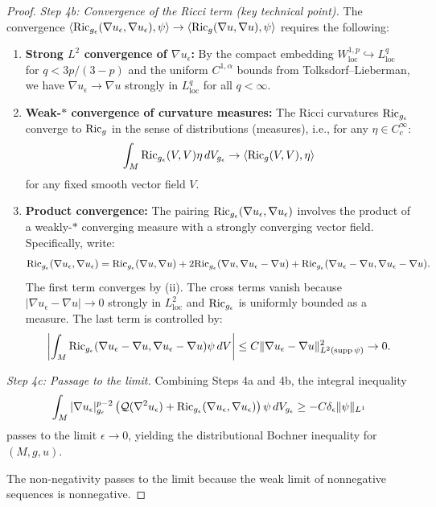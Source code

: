 \begin{proof}
\textit{Step 4b: Convergence of the Ricci term (key technical point).}
The convergence $\langle \mathrm{Ric}_{g_\epsilon}(\nabla u_\epsilon, \nabla u_\epsilon), \psi \rangle \to \langle \mathrm{Ric}_g(\nabla u, \nabla u), \psi \rangle$ requires the following:
\begin{enumerate}
    \item[(i)] \textbf{Strong $L^2$ convergence of $\nabla u_\epsilon$:} By the compact embedding $W^{1,p}_{\mathrm{loc}} \hookrightarrow L^q_{\mathrm{loc}}$ for $q < 3p/(3-p)$ and the uniform $C^{1,\alpha}$ bounds from Tolksdorf--Lieberman, we have $\nabla u_\epsilon \to \nabla u$ strongly in $L^q_{\mathrm{loc}}$ for all $q < \infty$.
    \item[(ii)] \textbf{Weak-$*$ convergence of curvature measures:} The Ricci curvatures $\mathrm{Ric}_{g_\epsilon}$ converge to $\mathrm{Ric}_g$ in the sense of distributions (measures), i.e., for any $\eta \in C^\infty_c$:
    \begin{equation}
        \int_M \mathrm{Ric}_{g_\epsilon}(V, V) \eta \, dV_{g_\epsilon} \to \langle \mathrm{Ric}_g(V, V), \eta \rangle
    \end{equation}
    for any fixed smooth vector field $V$.
    \item[(iii)] \textbf{Product convergence:} The pairing $\mathrm{Ric}_{g_\epsilon}(\nabla u_\epsilon, \nabla u_\epsilon)$ involves the product of a weakly-$*$ converging measure with a strongly converging vector field. Specifically, write:
    \begin{equation}
        \mathrm{Ric}_{g_\epsilon}(\nabla u_\epsilon, \nabla u_\epsilon) = \mathrm{Ric}_{g_\epsilon}(\nabla u, \nabla u) + 2\mathrm{Ric}_{g_\epsilon}(\nabla u, \nabla u_\epsilon - \nabla u) + \mathrm{Ric}_{g_\epsilon}(\nabla u_\epsilon - \nabla u, \nabla u_\epsilon - \nabla u).
    \end{equation}
    The first term converges by (ii). The cross terms vanish because $|\nabla u_\epsilon - \nabla u| \to 0$ strongly in $L^2_{\mathrm{loc}}$ and $\mathrm{Ric}_{g_\epsilon}$ is uniformly bounded as a measure. The last term is controlled by:
    \begin{equation}
        \left| \int_M \mathrm{Ric}_{g_\epsilon}(\nabla u_\epsilon - \nabla u, \nabla u_\epsilon - \nabla u) \psi \, dV \right| \le C \|\nabla u_\epsilon - \nabla u\|_{L^2(\mathrm{supp}\,\psi)}^2 \to 0.
    \end{equation}
\end{enumerate}

\textit{Step 4c: Passage to the limit.}
Combining Steps 4a and 4b, the integral inequality
\begin{equation}
    \int_M |\nabla u_\epsilon|^{p-2}_{g_\epsilon} \left(\mathcal{Q}(\nabla^2 u_\epsilon) + \mathrm{Ric}_{g_\epsilon}(\nabla u_\epsilon, \nabla u_\epsilon)\right) \psi \, dV_{g_\epsilon} \ge -C\delta_\epsilon \|\psi\|_{L^1}
\end{equation}
passes to the limit $\epsilon \to 0$, yielding the distributional Bochner inequality for $(M, g, u)$.

The non-negativity passes to the limit because the weak limit of nonnegative sequences is nonnegative.
\end{proof}

